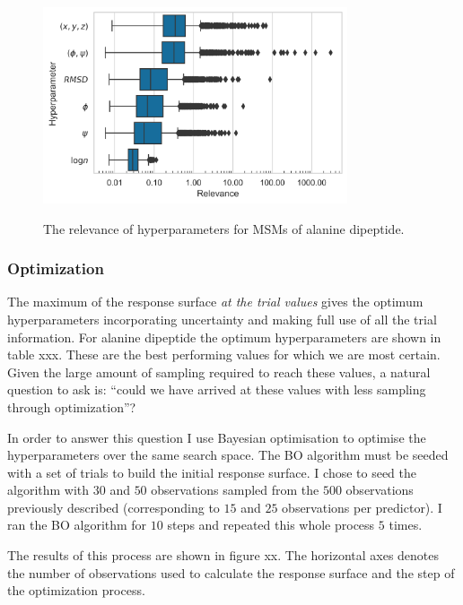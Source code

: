 \begin{figure}
    \centering
    \caption{The relevance of hyperparameters for MSMs of alanine dipeptide. }
    \includegraphics[width=0.8\textwidth]{chapters/msm_optimization/figures/ala1_relevance.png}
    \label{fig:ala1_relevance}
\end{figure}


\subsubsection{Optimization}

The maximum of the response surface \emph{at the trial values} gives the optimum hyperparameters incorporating uncertainty and making full use of all the trial information. For alanine dipeptide the optimum hyperparameters are shown in table xxx. These are the best performing values for which we are most certain.  Given the large amount of sampling required to reach these values, a natural question to ask is: ``could we have arrived at these values with less sampling through optimization''?

In order to answer this question I use Bayesian optimisation to optimise the hyperparameters over the same search space. The BO algorithm must be seeded with a set of trials to build the initial response surface. I chose to seed the algorithm with $30$ and $50$ observations sampled from the $500$ observations previously described (corresponding to $15$ and $25$ observations per predictor). I ran the BO algorithm for $10$ steps and repeated this whole process $5$ times. 


The results of this process are shown in figure xx. The horizontal axes denotes the number of observations used to calculate the response surface and the step of the optimization process. 


